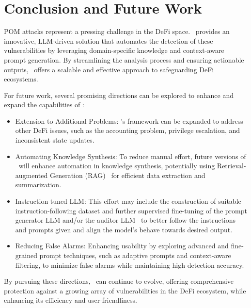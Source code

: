 \section{Conclusion and Future Work}\label{sec:conclusion}
POM attacks represent a pressing challenge in the DeFi space. \tool~provides an innovative, LLM-driven solution that automates the detection of these vulnerabilities by leveraging domain-specific knowledge and context-aware prompt generation. By streamlining the analysis process and ensuring actionable outputs, \tool~offers a scalable and effective approach to safeguarding DeFi ecosystems.

For future work, several promising directions can be explored to enhance and expand the capabilities of \tool:

\begin{itemize}
\item Extension to Additional Problems: \tool's framework can be expanded to address other DeFi issues, such as the accounting problem, privilege escalation, and inconsistent state updates.

\item Automating Knowledge Synthesis: To reduce manual effort, future versions of \tool~will enhance automation in knowledge synthesis, potentially using Retrieval-augmented Generation (RAG)~\cite{gao2023retrieval} for efficient data extraction and summarization.

\item Instruction-tuned LLM: This effort may include the construction of suitable instruction-following dataset and further supervised fine-tuning of the prompt generator LLM and/or the auditor LLM~\cite{longpre2023flan} to better follow the instructions and prompts given and align the model's behave towards desired output.

\item Reducing False Alarms: Enhancing usability by exploring advanced and fine-grained prompt techniques, such as adaptive prompts and context-aware filtering, to minimize false alarms while maintaining high detection accuracy.
\end{itemize}

By pursuing these directions, \tool~can continue to evolve, offering comprehensive protection against a growing array of vulnerabilities in the DeFi ecosystem, while enhancing its efficiency and user-friendliness.